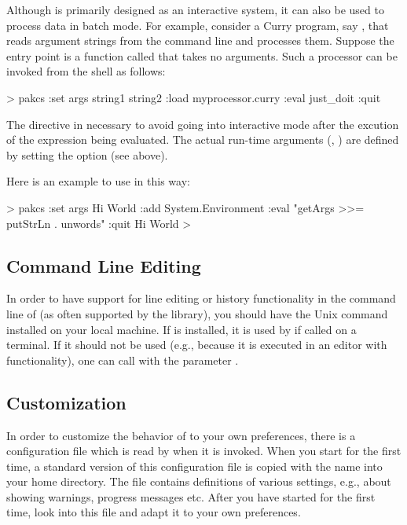 Although \CYS is primarily designed as an interactive system,
it can also be used to process data in batch mode.
For example, consider a Curry program, say , that
reads argument strings from the command line and processes them.
Suppose the entry point is a function called 
that takes no arguments. Such a processor can be invoked from
the shell as follows:
\begin{curry}
> pakcs :set args string1 string2 :load myprocessor.curry :eval just_doit :quit
\end{curry}
The  directive in necessary to avoid \CYS going
into interactive mode after the
excution of the expression being evaluated.
The actual run-time arguments (, )
are defined by setting the option  (see above).

Here is an example to use \CYS in this way:
\begin{curry}
> pakcs :set args Hi World :add System.Environment :eval "getArgs >>= putStrLn . unwords" :quit
Hi World
>
\end{curry}


\subsection{Command Line Editing}
\label{sec:readline}

In order to have support for line editing or history functionality
in the command line of \CYS (as often supported by the 
library), you should have the Unix command  installed
on your local machine.
If  is installed, it is used by \CYS if called on a terminal.
If it should not be used (e.g., because it is executed
in an editor with  functionality), one can
call \CYS with the parameter .


\subsection{Customization}
\label{sec-customization}

In order to customize the behavior of \CYS to your own preferences,
there is a configuration file which is read by \CYS when it is invoked.
When you start \CYS for the first time, a standard version of
this configuration file is copied with the name
into your home directory. The file contains definitions
of various settings, e.g., about showing warnings, progress messages etc.
After you have started \CYS for the first time, look into this file
and adapt it to your own preferences.


